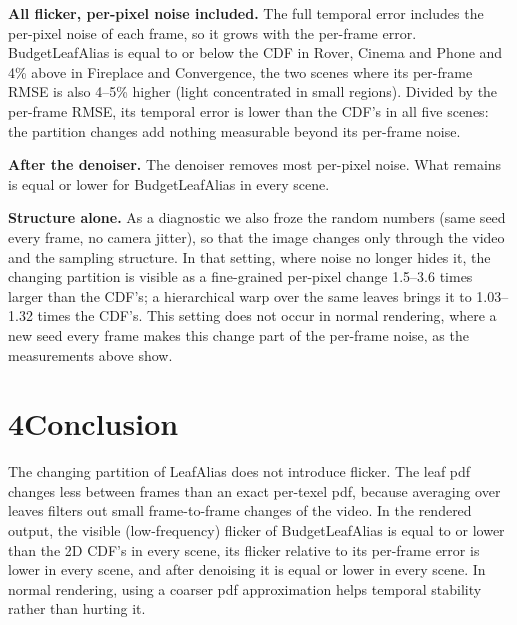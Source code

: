 \documentclass[10pt]{article}
\begin{document}
\textbf{All flicker, per-pixel noise included.} The full temporal error includes the per-pixel noise of each frame, so it grows with the per-frame error. BudgetLeafAlias is equal to or below the CDF in Rover, Cinema and Phone and 4\% above in Fireplace and Convergence, the two scenes where its per-frame RMSE is also 4--5\% higher (light concentrated in small regions). Divided by the per-frame RMSE, its temporal error is lower than the CDF's in all five scenes: the partition changes add nothing measurable beyond its per-frame noise.

\textbf{After the denoiser.} The denoiser removes most per-pixel noise. What remains is equal or lower for BudgetLeafAlias in every scene.

\textbf{Structure alone.} As a diagnostic we also froze the random numbers (same seed every frame, no camera jitter), so that the image changes only through the video and the sampling structure. In that setting, where noise no longer hides it, the changing partition is visible as a fine-grained per-pixel change 1.5--3.6 times larger than the CDF's; a hierarchical warp over the same leaves brings it to 1.03--1.32 times the CDF's. This setting does not occur in normal rendering, where a new seed every frame makes this change part of the per-frame noise, as the measurements above show.

\section*{4\quad Conclusion}

The changing partition of LeafAlias does not introduce flicker. The leaf pdf changes less between frames than an exact per-texel pdf, because averaging over leaves filters out small frame-to-frame changes of the video. In the rendered output, the visible (low-frequency) flicker of BudgetLeafAlias is equal to or lower than the 2D CDF's in every scene, its flicker relative to its per-frame error is lower in every scene, and after denoising it is equal or lower in every scene. In normal rendering, using a coarser pdf approximation helps temporal stability rather than hurting it.
\end{document}
